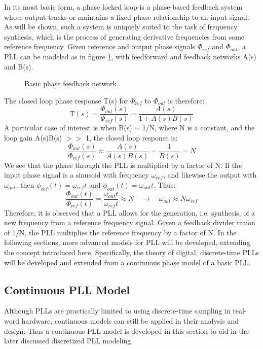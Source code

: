 
	In its most basic form, a phase locked loop is a phase-based feedback system whose output tracks or maintains a fixed phase relationship to an input signal. As will be shown, such a system is uniquely suited to the task of frequency synthesis, which is the process of generating derivative frequencies from some reference frequency. Given reference and output phase signals $\Phi_{ref}$ and $\Phi_{out}$, a PLL can be modeled as in figure \ref{fig:basic_fb}, with feedforward and feedback networks A(s) and B(s). 
	\begin{figure}[htb!]
		\center
		\caption{Basic phase feedback network.}
		\label{fig:basic_fb}
	\end{figure}
	\FloatBarrier
	The closed loop phase response T(s) for $\Phi_{ref}$ to $\Phi_{out}$ is therefore:
	\begin{equation}
		\mathrm{T}(s) = \frac{\Phi_{out}(s)}{\Phi_{ref}(s)} = \frac{A(s)}{1+A(s)B(s)}
	\end{equation}
	A particular case of interest is when B(s) = 1/N, where N is a constant, and the loop gain A(s)B(s) $>>$ 1, the closed loop response is:
	\begin{equation}\label{mult_by_n}
		\frac{\Phi_{out}(s)}{\Phi_{ref}(s)} \approx \frac{A(s)}{A(s)B(s)} = \frac{1}{B(s)} = N
	\end{equation}
	We see that the phase through the PLL is multiplied by a factor of N. If the input phase signal is a sinusoid with frequency $\omega_{ref}$, and likewise the output with $\omega_{out}$, then $\phi_{ref}(t)=\omega_{ref}t$ and $\phi_{out}(t)=\omega_{out}t$. Thus:
	\begin{equation}
		\frac{\Phi_{out}(t)}{\Phi_{ref}(t)} = \frac{\omega_{out}t}{\omega_{ref}t} \approx N \hspace{1em} \rightarrow \hspace{1em} \omega_{out} \approx N\omega_{ref}
	\end{equation}
	Therefore, it is observed that a PLL allows for the generation, i.e. synthesis, of a new frequency from a reference frequency signal. Given a feedback divider ration of 1/N, the PLL multiplies the reference frequency by a factor of N. In the following sections, more advanced models for PLL will be developed, extending the concept introduced here. Specifically, the theory of digital, discrete-time PLLs will be developed and extended from a continuous phase model of a basic PLL.

	\subsection{Continuous PLL Model}
		Although PLLs are practically limited to using discrete-time sampling in real-word hardware, continuous models can still be applied in their analysis and design. Thus a continuous PLL model is developed in this section to aid in the later discussed discretized PLL modeling.


